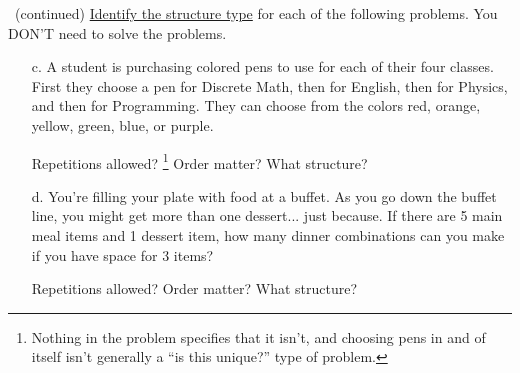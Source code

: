     \begin{questionNOGRADE}{\thequestion\ (continued)}
        \underline{Identify the structure type} for each of the following problems.
        You DON'T need to solve the problems.

        \begin{enumerate}
            \item[c.]   A student is purchasing colored pens to use for each of their four classes.
                        First they choose a pen for Discrete Math, then for English, then for
                        Physics, and then for Programming. They can choose from the colors
                        red, orange, yellow, green, blue, or purple.
                        \begin{center}
                            Repetitions allowed? \footnote{Nothing in the problem specifies that it isn't, and choosing pens in and of itself isn't generally a ``is this unique?'' type of problem.}
                            \tab Order matter? \tab What structure?
                        \end{center}
                        
            \item[d.]   You're filling your plate with food at a buffet. As you go down the buffet line,
                        you might get more than one dessert... just because. If there are 5 main meal items
                        and 1 dessert item, how many dinner combinations can you make if you have space for 3 items?
                        \begin{center}
                            Repetitions allowed?
                            \tab Order matter? \tab What structure?
                        \end{center}
        \end{enumerate}
    \end{questionNOGRADE}

    \hrulefill
    
